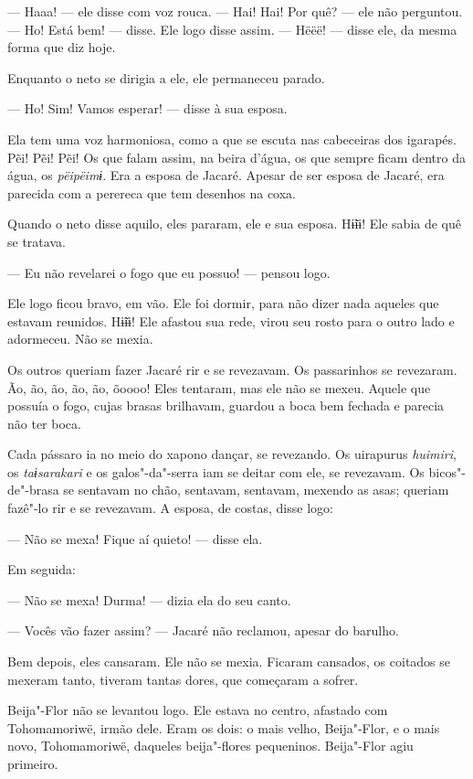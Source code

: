--- Haaa! --- ele disse com voz rouca. --- Hai! Hai! Por quê? --- ele não perguntou. --- Ho! Está bem! --- disse. Ele logo disse assim. --- Hëëë! --- disse ele, da mesma forma que diz hoje. 

Enquanto o neto se dirigia a ele, ele permaneceu parado. 

--- Ho! Sim! Vamos esperar! --- disse à sua esposa. 

Ela tem uma voz harmoniosa, como a que se escuta nas cabeceiras dos
igarapés. Pẽi! Pẽi! Pẽi! Os que falam assim, na beira d'água, os
que sempre ficam dentro da água, os \emph{pëipëimɨ}. Era a esposa de
Jacaré. Apesar de ser esposa de Jacaré, era parecida com a perereca que
tem desenhos na coxa. 

Quando o neto disse aquilo, eles pararam, ele e sua esposa. Hɨ̃ɨɨ!
Ele sabia de quê se tratava. 

--- Eu não revelarei o fogo que eu possuo! --- pensou logo. 

Ele logo ficou bravo, em vão. Ele foi dormir, para não dizer nada
aqueles que estavam reunidos. Hɨ̃ɨɨ! Ele afastou sua rede, virou
seu rosto para o outro lado e adormeceu. Não se mexia. 

Os outros queriam fazer Jacaré rir e se revezavam. Os passarinhos se
revezaram. Ão, ão, ão, ão, ão, õoooo! Eles tentaram, mas ele não
se mexeu. Aquele que possuía o fogo, cujas brasas brilhavam, guardou a
boca bem fechada e parecia não ter boca. 

Cada pássaro ia no meio do xapono dançar, se revezando.
Os uirapurus \emph{huimiri}, os \emph{taɨsarakari} e os galos"-da"-serra iam se deitar
com ele, se revezavam. Os bicos"-de"-brasa se sentavam no chão, sentavam,
sentavam, mexendo as asas; queriam fazê"-lo rir e se revezavam. A esposa,
de costas, disse logo: 

--- Não se mexa! Fique aí quieto! --- disse ela.

Em seguida:

--- Não se mexa! Durma! --- dizia ela do seu canto.

--- Vocês vão fazer assim? --- Jacaré não reclamou, apesar do barulho. 

Bem depois, eles cansaram. Ele não se mexia. Ficaram cansados, os
coitados se mexeram tanto, tiveram tantas dores, que começaram a
sofrer. 

Beija"-Flor não se levantou logo. Ele estava no centro, afastado com
Tohomamoriwë, irmão dele. Eram os dois: o mais velho, Beija"-Flor, e o
mais novo, Tohomamoriwë, daqueles beija"-flores pequeninos. Beija"-Flor
agiu primeiro. 

